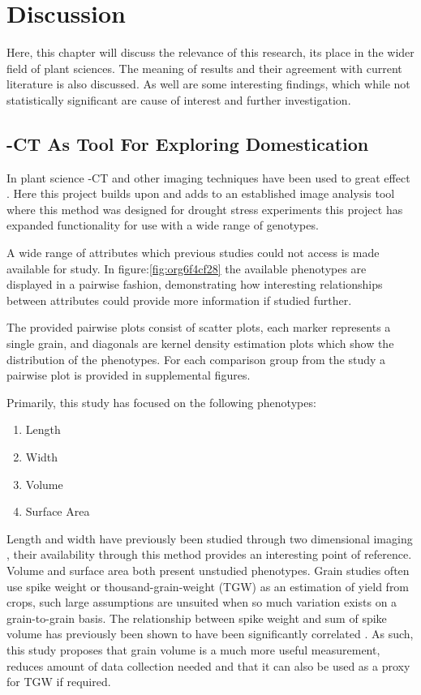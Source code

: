 \documentclass[11pt]{report}
\begin{document}
\clearpage
\chapter{Discussion}
\label{sec:org7e0d0da}

Here, this chapter will discuss the relevance of this research, its place in the wider field of plant sciences. The meaning of results and their agreement with current literature is also discussed. As well are some interesting findings, which while not statistically significant are cause of interest and further investigation.

\section{\textmu{}-CT As Tool For Exploring Domestication}
\label{sec:orge90e0c5}
In plant science \textmu{}-CT and other imaging techniques have been used to great effect \cite{Hubeau2015,Staedler2013,Metzner2015}. Here this project builds upon and adds to an established image analysis tool \cite{Hughes2017} where this method was designed for drought stress experiments this project has expanded functionality for use with a wide range of genotypes.

A wide range of attributes which previous studies could not access \cite{Gegas2010} is made available for study. In figure:\ref{fig:org6f4cf28} the available phenotypes are displayed in a pairwise fashion, demonstrating how interesting relationships between attributes could provide more information if studied further.

The provided pairwise plots consist of scatter plots, each marker represents a single grain, and diagonals are kernel density estimation plots which show the distribution of the phenotypes. For each comparison group from the study a pairwise plot is provided in supplemental figures.

Primarily, this study has focused on the following phenotypes:

\begin{enumerate}
\item Length
\item Width
\item Volume
\item Surface Area
\end{enumerate}

Length and width have previously been studied through two dimensional imaging \cite{Gegas2010}, their availability through this method provides an interesting point of reference. Volume and surface area both present unstudied phenotypes. Grain studies often use spike weight or thousand-grain-weight (TGW) as an estimation of yield from crops, such large assumptions are unsuited when so much variation exists on a grain-to-grain basis. The relationship between spike weight and sum of spike volume has previously been shown to have been significantly correlated \cite{Hughes2017}. As such, this study proposes that grain volume is a much more useful measurement, reduces amount of data collection needed and that it can also be used as a proxy for TGW if required.
\end{document}
